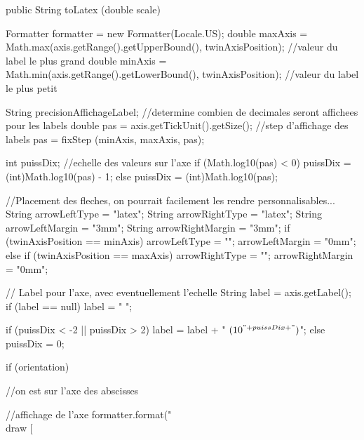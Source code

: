 \begin{code}

   public String toLatex (double scale) \begin{hide} {
      Formatter formatter = new Formatter(Locale.US);
      double maxAxis = Math.max(axis.getRange().getUpperBound(), twinAxisPosition);  //valeur du label le plus grand
      double minAxis = Math.min(axis.getRange().getLowerBound(), twinAxisPosition);  //valeur du label le plus petit

      String precisionAffichageLabel;  //determine combien de decimales seront affichees pour les labels
      double pas = axis.getTickUnit().getSize();   //step d'affichage des labels
      pas = fixStep (minAxis, maxAxis, pas);

      int puissDix;                                //echelle des valeurs sur l'axe
      if (Math.log10(pas) < 0)
         puissDix = (int)Math.log10(pas) - 1;
      else
         puissDix = (int)Math.log10(pas);

      //Placement des fleches, on pourrait facilement les rendre personnalisables...
      String arrowLeftType = "latex";
      String arrowRightType = "latex";
      String arrowLeftMargin = "3mm";
      String arrowRightMargin = "3mm";
      if (twinAxisPosition == minAxis) {
         arrowLeftType = "";
         arrowLeftMargin = "0mm";
      } else if (twinAxisPosition == maxAxis) {
         arrowRightType = "";
         arrowRightMargin = "0mm";
      }

      // Label pour l'axe, avec eventuellement l'echelle
      String label = axis.getLabel();
      if (label == null)
         label = " ";

      if (puissDix < -2 || puissDix > 2)
         label = label + " $(10^{" + puissDix + "})$";
      else
         puissDix = 0;

      if (orientation) { //on est sur l'axe des abscisses

         //affichage de l'axe
         formatter.format("\\draw [%

}}
\end{hide}
\end{code}
